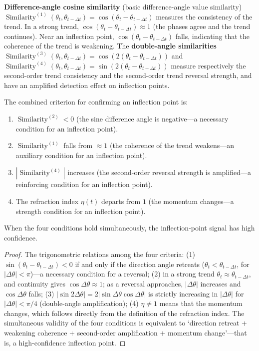 \begin{proposition}\label{prop:trend_similarity_stock}
\textbf{Difference-angle cosine similarity} (basic difference-angle value similarity) $\operatorname{Similarity}^{(1)}(\theta_t, \theta_{t-\Delta t}) = \cos(\theta_t - \theta_{t-\Delta t})$ measures the consistency of the trend. In a strong trend, $\cos(\theta_t - \theta_{t-\Delta t}) \approx 1$ (the phases agree and the trend continues). Near an inflection point, $\cos(\theta_t - \theta_{t-\Delta t})$ falls, indicating that the coherence of the trend is weakening. The \textbf{double-angle similarities} $\operatorname{Similarity}^{(3)}(\theta_t, \theta_{t-\Delta t}) = \cos(2(\theta_t - \theta_{t-\Delta t}))$ and $\operatorname{Similarity}^{(4)}(\theta_t, \theta_{t-\Delta t}) = \sin(2(\theta_t - \theta_{t-\Delta t}))$ measure respectively the second-order trend consistency and the second-order trend reversal strength, and have an amplified detection effect on inflection points.

The combined criterion for confirming an inflection point is:
\begin{enumerate}[label=(\roman*)]
    \item $\operatorname{Similarity}^{(2)} < 0$ (the sine difference angle is negative---a necessary condition for an inflection point).
    \item $\operatorname{Similarity}^{(1)}$ falls from $\approx 1$ (the coherence of the trend weakens---an auxiliary condition for an inflection point).
    \item $|\operatorname{Similarity}^{(4)}|$ increases (the second-order reversal strength is amplified---a reinforcing condition for an inflection point).
    \item The refraction index $\eta(t)$ departs from $1$ (the momentum changes---a strength condition for an inflection point).
\end{enumerate}
When the four conditions hold simultaneously, the inflection-point signal has high confidence.
\end{proposition}

\begin{proof}
The trigonometric relations among the four criteria: (1) $\sin(\theta_t - \theta_{t-\Delta t}) < 0$ if and only if the direction angle retreats ($\theta_t < \theta_{t-\Delta t}$, for $|\Delta\theta| < \pi$)---a necessary condition for a reversal; (2) in a strong trend $\theta_t \approx \theta_{t-\Delta t}$, and continuity gives $\cos\Delta\theta \approx 1$; as a reversal approaches, $|\Delta\theta|$ increases and $\cos\Delta\theta$ falls; (3) $|\sin 2\Delta\theta| = 2|\sin\Delta\theta\cos\Delta\theta|$ is strictly increasing in $|\Delta\theta|$ for $|\Delta\theta| < \pi/4$ (double-angle amplification); (4) $\eta \neq 1$ means that the momentum changes, which follows directly from the definition of the refraction index. The simultaneous validity of the four conditions is equivalent to `direction retreat $+$ weakening coherence $+$ second-order amplification $+$ momentum change'---that is, a high-confidence inflection point.
\end{proof}

